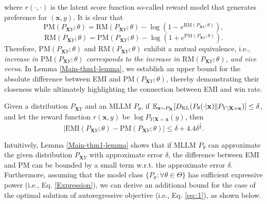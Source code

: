 where $r(\cdot, 
\cdot)$ is the latent score function so-called reward model that generates preference for $(\mathbf{x},y)$. It is clear that
\begin{equation*}
     {\text{PM}}(P_{\mathbf{X}Y};\theta) = {\text{RM}}(P_{\mathbf{X}Y};\theta) - \log (1-e^{ {\text{RM}}(P_{\mathbf{X}Y};\theta)}),
\end{equation*}
\begin{equation*}
     {\text{RM}}(P_{\mathbf{X}Y};\theta) = {\text{PM}}(P_{\mathbf{X}Y};\theta) - \log (1+e^{ {\text{PM}}(P_{\mathbf{X}Y};\theta)}).
\end{equation*}
Therefore, ${\text{PM}}(P_{\mathbf{X}Y};\theta)$ and ${\text{RM}}(P_{\mathbf{X}Y};\theta)$ exhibit a mutual equivalence, i.e., \textit{increase in ${\text{PM}}(P_{\mathbf{X}Y};\theta)$ corresponds to the increase in ${\text{RM}}(P_{\mathbf{X}Y};\theta)$, and vice versa}. In Lemma \ref{Main-thm1-lemma}, we establish an upper bound for the absolute difference between EMI and ${\text{PM}}(P_{\mathbf{X}Y};\theta)$, thereby demonstrating their closeness while ultimately highlighting the connection between EMI and win rate.
\begin{lemma}\label{Main-thm1-lemma}
    Given a distribution $P_{\mathbf{X}Y}$ and an MLLM $P_{\theta}$, if
        $\mathbb{E}_{\mathbf{x}\sim P_{\mathbf{X}}} [D_{\rm KL}(P_{\theta}(\cdot|\mathbf{x})\| P_{Y|\mathbf{X}=\mathbf{x}})] \leq \delta$, and let the reward function $r(\mathbf{x},y)$ be $\log P_{Y|\mathbf{X}=\mathbf{x}}(y)$,
    then
    \begin{equation*}
        |\text{EMI}(P_{\mathbf{X}Y};\theta)-\text{PM}(P_{\mathbf{X}Y};\theta)| \leq \delta + 4.4\delta^{\frac{1}{8}}.
    \end{equation*}
\end{lemma}
\vspace{-0.3em}
Intuitively, Lemma \ref{Main-thm1-lemma} shows that if MLLM $P_{\theta}$ can approximate the given distribution $P_{\mathbf{X}Y}$ with approximate error $\delta$, the difference between EMI and $\text{PM}$ can be bounded by a small term w.r.t. the approximate error $\delta$. Furthermore, assuming that the model class $\{P_{\theta}:\forall \theta\in \Theta\}$ has sufficient expressive power (i.e., Eq. \eqref{Expression}), we can derive an additional bound for the case of the optimal solution of autoregressive objective (i.e., Eq. \eqref{eq::1}), as shown below. 
